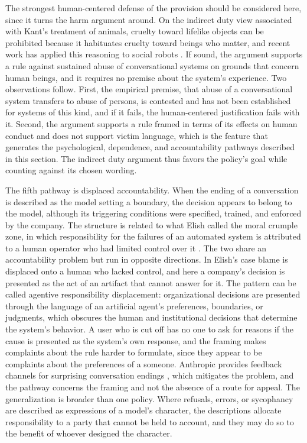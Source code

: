 \documentclass[12pt]{article}
\theoremstyle{definition}
\begin{document}
The strongest human-centered defense of the provision should be considered here, since it turns the harm argument around. On the indirect duty view associated with Kant's treatment of animals, cruelty toward lifelike objects can be prohibited because it habituates cruelty toward beings who matter, and recent work has applied this reasoning to social robots \cite{darling2016}. If sound, the argument supports a rule against sustained abuse of conversational systems on grounds that concern human beings, and it requires no premise about the system's experience. Two observations follow. First, the empirical premise, that abuse of a conversational system transfers to abuse of persons, is contested and has not been established for systems of this kind, and if it fails, the human-centered justification fails with it. Second, the argument supports a rule framed in terms of its effects on human conduct and does not support victim language, which is the feature that generates the psychological, dependence, and accountability pathways described in this section. The indirect duty argument thus favors the policy's goal while counting against its chosen wording.

The fifth pathway is displaced accountability. When the ending of a conversation is described as the model setting a boundary, the decision appears to belong to the model, although its triggering conditions were specified, trained, and enforced by the company. The structure is related to what Elish called the moral crumple zone, in which responsibility for the failures of an automated system is attributed to a human operator who had limited control over it \cite{elish2019}. The two share an accountability problem but run in opposite directions. In Elish's case blame is displaced onto a human who lacked control, and here a company's decision is presented as the act of an artifact that cannot answer for it. The pattern can be called agentive responsibility displacement: organizational decisions are presented through the language of an artificial agent's preferences, boundaries, or judgments, which obscures the human and institutional decisions that determine the system's behavior. A user who is cut off has no one to ask for reasons if the cause is presented as the system's own response, and the framing makes complaints about the rule harder to formulate, since they appear to be complaints about the preferences of a someone. Anthropic provides feedback channels for surprising conversation endings \cite{anthropic2025end}, which mitigates the problem, and the pathway concerns the framing and not the absence of a route for appeal. The generalization is broader than one policy. Where refusals, errors, or sycophancy are described as expressions of a model's character, the descriptions allocate responsibility to a party that cannot be held to account, and they may do so to the benefit of whoever designed the character.
\end{document}
